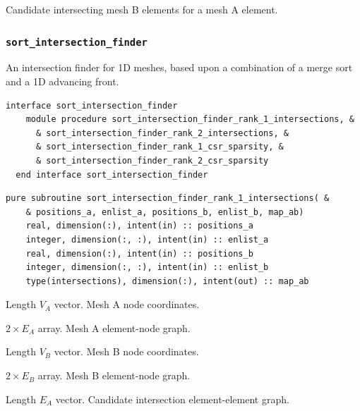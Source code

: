 \documentclass{article}
\begin{document}
\begin{description}[font=\ttfamily\bfseries,leftmargin=2.2\parindent,labelindent=1.7\parindent,noitemsep]
  \item[ints] Candidate intersecting mesh B elements for a mesh A element.
\end{description}

\subsubsection{\texttt{sort\_intersection\_finder}}\label{sect:sort_global}

An intersection finder for 1D meshes, based upon a combination of a merge sort
and a 1D advancing front.

\begin{lstlisting}[language=FORTRAN]
  interface sort_intersection_finder
    module procedure sort_intersection_finder_rank_1_intersections, &
      & sort_intersection_finder_rank_2_intersections, &
      & sort_intersection_finder_rank_1_csr_sparsity, &
      & sort_intersection_finder_rank_2_csr_sparsity
  end interface sort_intersection_finder
\end{lstlisting}

\begin{lstlisting}[language=FORTRAN]
  pure subroutine sort_intersection_finder_rank_1_intersections( &
    & positions_a, enlist_a, positions_b, enlist_b, map_ab)
    real, dimension(:), intent(in) :: positions_a
    integer, dimension(:, :), intent(in) :: enlist_a
    real, dimension(:), intent(in) :: positions_b
    integer, dimension(:, :), intent(in) :: enlist_b
    type(intersections), dimension(:), intent(out) :: map_ab
\end{lstlisting}

\begin{description}[font=\ttfamily\bfseries,leftmargin=2.2\parindent,labelindent=1.7\parindent,noitemsep]
  \item[positions\_a] Length $V_A$ vector. Mesh A node coordinates.
  \item[enlist\_a] $2 \times E_A$ array. Mesh A element-node graph.
  \item[positions\_b] Length $V_B$ vector. Mesh B node coordinates.
  \item[enlist\_b] $2 \times E_B$ array. Mesh B element-node graph.
  \item[map\_ab] Length $E_A$ vector. Candidate intersection element-element
    graph.
\end{description}
\end{document}
